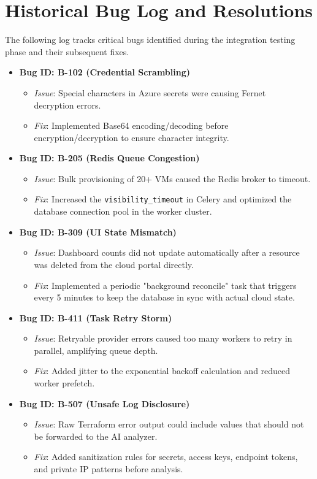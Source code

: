 \section{Historical Bug Log and Resolutions}
The following log tracks critical bugs identified during the integration testing phase and their subsequent fixes.

\begin{itemize}
    \item \textbf{Bug ID: B-102 (Credential Scrambling)}
        \begin{itemize}
            \item \textit{Issue}: Special characters in Azure secrets were causing Fernet \\ decryption errors.
            \item \textit{Fix}: Implemented Base64 encoding/decoding before encryption/decryption to ensure character integrity.
        \end{itemize}
    \item \textbf{Bug ID: B-205 (Redis Queue Congestion)}
        \begin{itemize}
            \item \textit{Issue}: Bulk provisioning of 20+ VMs caused the Redis broker to timeout.
\item \textit{Fix}: Increased the \texttt{visibility\_timeout} in Celery and optimized the database connection pool in the worker cluster.
        \end{itemize}
    \item \textbf{Bug ID: B-309 (UI State Mismatch)}
        \begin{itemize}
            \item \textit{Issue}: Dashboard counts did not update automatically after a resource was deleted from the cloud portal directly.
            \item \textit{Fix}: Implemented a periodic "background reconcile" task that triggers every 5 minutes to keep the database in sync with actual cloud state.
        \end{itemize}
    \item \textbf{Bug ID: B-411 (Task Retry Storm)}
        \begin{itemize}
            \item \textit{Issue}: Retryable provider errors caused too many workers to retry in parallel, amplifying queue depth.
            \item \textit{Fix}: Added jitter to the exponential backoff calculation and reduced worker prefetch.
        \end{itemize}
    \item \textbf{Bug ID: B-507 (Unsafe Log Disclosure)}
        \begin{itemize}
            \item \textit{Issue}: Raw Terraform error output could include values that should not be forwarded to the AI analyzer.
            \item \textit{Fix}: Added sanitization rules for secrets, access keys, endpoint tokens, and private IP patterns before analysis.
        \end{itemize}
\end{itemize}

\newpage
